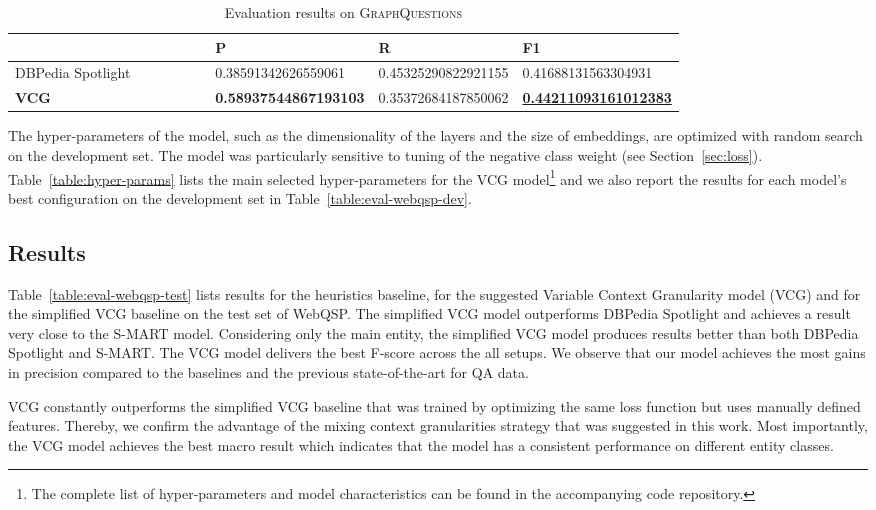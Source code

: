\documentclass[11pt,a4paper]{article}
\begin{document}
\begin{table}[t]
  \begin{center}
  \begin{tabular}{>{\raggedleft}p{0.4\linewidth}
  >{\raggedleft}p{0.18\linewidth}
  >{\raggedleft}p{0.1\linewidth}   
  >{\raggedleft\arraybackslash}p{0.1\linewidth}}
  \toprule 
  & P & R & F1\\ 
    \midrule 
    DBPedia Spotlight & \num{0.38591342626559061} & \num{0.45325290822921155} & \num{0.41688131563304931} \\
    \textbf{VCG} & \textbf{\num{0.58937544867193103}} & \num{0.35372684187850062} & \underline{\textbf{\num{0.44211093161012383}}}\\ \bottomrule
  \end{tabular} 
  \end{center}
  \caption{Evaluation results on \textsc{GraphQuestions}\label{table:eval-graph-test}}
\end{table}


The hyper-parameters of the model, such as the dimensionality of the layers and the size of embeddings, are optimized with random search on the development set. The model was particularly sensitive to tuning of the negative class weight  (see Section~\ref{sec:loss}). Table~\ref{table:hyper-params} lists the main selected hyper-parameters for the VCG model\footnote{The complete list of hyper-parameters and model characteristics can be found in the accompanying code repository.} and we also report the results for each model's best configuration on the development set in Table~\ref{table:eval-webqsp-dev}.


\subsection{Results}

Table~\ref{table:eval-webqsp-test} lists results for the heuristics baseline, for the suggested Variable Context Granularity model (VCG) and for the simplified VCG baseline on the test set of WebQSP.
The simplified VCG model outperforms DBPedia Spotlight and achieves a result very close to the S-MART model. 
Considering only the main entity, the simplified VCG model produces results better than both DBPedia Spotlight and S-MART. 
The VCG model delivers the best F-score across the all setups. We observe that our model achieves the most gains in precision compared to the baselines and the previous state-of-the-art for QA data. 

VCG constantly outperforms the simplified VCG baseline that was trained by optimizing the same loss function but uses manually defined features. Thereby, we confirm the advantage of the mixing context granularities strategy that was suggested in this work.
Most importantly, the VCG model achieves the best macro result which indicates that the model has a consistent performance on different entity classes.
\end{document}
